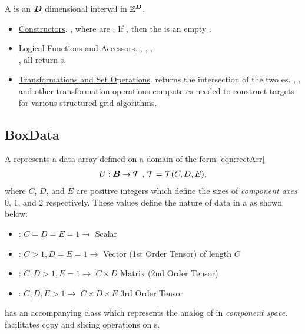 \documentclass[12pt]{article}
\begin{document}
A  is an ${\boldsymbol{D}}$ dimensional interval in $\mathbb{Z}^{{\boldsymbol{D}}}$.

\begin{itemize}
\item
\underline{Constructors}. , where  are . If , then the  is an empty .
\item
\underline{Logical Functions and Accessors}.
, , , \\ ,  all return s. 
\item
\underline{Transformations and Set Operations}.  returns the intersection of the two es. , ,  and other transformation operations compute es needed to construct  targets for various structured-grid algorithms.
\end{itemize}
\subsection{BoxData}

A  represents a data array defined on a  domain of the form \eqref{eqn:rectArr}
\begin{gather*}
U:{\boldsymbol{B}} \rightarrow \mathcal{T} \hbox{ , } \mathcal{T} = \mathcal{T}(C,D,E),
\end{gather*}
where $C$, $D$, and $E$ are positive integers which define the sizes of \textit{component axes} 0, 1, and 2 respectively. These values define the nature of data in a  as shown below:

\begin{itemize}
\item: $C=D=E=1\rightarrow$ Scalar
\item: $C>1, D=E=1\rightarrow$ Vector (1st Order Tensor) of length $C$
\item: $C,D>1, E=1\rightarrow$ $C\times D$ Matrix (2nd Order Tensor)
\item: $C,D,E>1\rightarrow$ $C\times D\times E$ 3rd Order Tensor
\end{itemize}

 has an accompanying class  which represents the analog of  in \textit{component space}.  facilitates copy and slicing operations on s.
\end{document}
